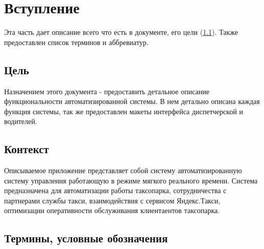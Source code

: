 

\chapter{Вступление}

		Эта часть дает описание всего что есть в документе, его цели (\ref{goals}). Также предоставлен список терминов и аббревиатур. 

		\section{Цель}\label{goals}

			Назначением этого документа - предоставить детальное описание функциональности автоматизированной системы. В нем детально описана каждая функция системы, так же предоставлен макеты интерфейса диспетчерской и водителей.

		\section{Контекст}

			Описываемое приложение представляет собой систему автоматизированную систему управления работающую в режиме мягкого реального времени. Система предназначена для автоматизации работы таксопарка, сотрудничества с партнерами службы такси, взаимодействия с сервисом Яндекс.Такси, оптимизации оперативности обслуживания клиентаентов таксопарка.

		\section{Термины, условные обозначения}

